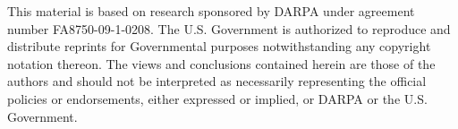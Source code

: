 \documentclass[12pt,letterpaper]{report}
\begin{document}
This material is based on research sponsored by DARPA under agreement number 
FA8750-09-1-0208. The U.S. Government is authorized to reproduce and distribute 
reprints for Governmental purposes notwithstanding any copyright notation 
thereon. The views and conclusions contained herein are those of the authors and
should not be interpreted as necessarily representing the official policies or 
endorsements, either expressed or implied, or DARPA or the U.S. Government.
  
\afteracknowledgementsp











\bibliographyp




\appendixpages       %
%
\end{document}
